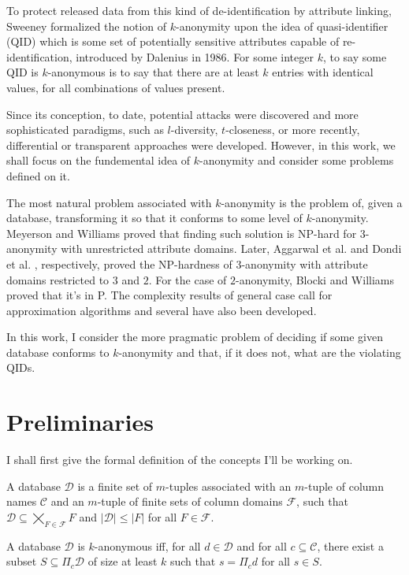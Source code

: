 \documentclass[12pt]{llncs}
\newcommand{\cC}{\mathcal{C}}
\newcommand{\cD}{\mathcal{D}}
\newcommand{\cF}{\mathcal{F}}
\newcommand{\Proj}[1]{\Pi_{#1}}
\begin{document}
To protect released data from this kind of de-identification by attribute linking, Sweeney formalized the notion of $k$-anonymity upon the idea of quasi-identifier (QID) which is some set of potentially sensitive attributes capable of re-identification, introduced by Dalenius \cite{Dalenius:1986} in 1986. For some integer $k$, to say some QID is $k$-anonymous is to say that there are at least $k$ entries with identical values, for all combinations of values present.

Since its conception, to date, potential attacks were discovered and more sophisticated paradigms, such as $l$-diversity, $t$-closeness, or more recently, differential or transparent approaches were developed. However, in this work, we shall focus on the fundemental idea of $k$-anonymity and consider some problems defined on it.

The most natural problem associated with $k$-anonymity is the problem of, given a database, transforming it so that it conforms to some level of $k$-anonymity. Meyerson and Williams \cite{Meyerson:2004} proved that finding such solution is NP-hard for $3$-anonymity with unrestricted attribute domains. Later, Aggarwal et al. \cite{Aggarwal:2005} and Dondi et al. \cite{Dondi:2009}, respectively, proved the NP-hardness of $3$-anonymity with attribute domains restricted to $3$ and $2$. For the case of $2$-anonymity, Blocki and Williams \cite{Blocki:2010} proved that it's in P. The complexity results of general case call for approximation algorithms and several have also been developed.

In this work, I consider the more pragmatic problem of deciding if some given database conforms to $k$-anonymity and that, if it does not, what are the violating QIDs.

\section{Preliminaries}
I shall first give the formal definition of the concepts I'll be working on.

\begin{definition}
A database $\cD$ is a finite set of $m$-tuples associated with an $m$-tuple of column names $\cC$ and an $m$-tuple of finite sets of column domains $\cF$, such that $\cD \subseteq \bigtimes_{F \in \cF} F$ and $|\cD| \leq |F|$ for all $F \in \cF$.
\end{definition}

\begin{definition}[$k$-anonymity]
A database $\cD$ is $k$-anonymous iff, for all $d \in \cD$ and for all $c \subseteq \cC$, there exist a subset $S \subseteq \Proj{c} \cD$ of size at least $k$ such that $s = \Proj{c} d$ for all $s \in S$.
\end{definition}
\end{document}
